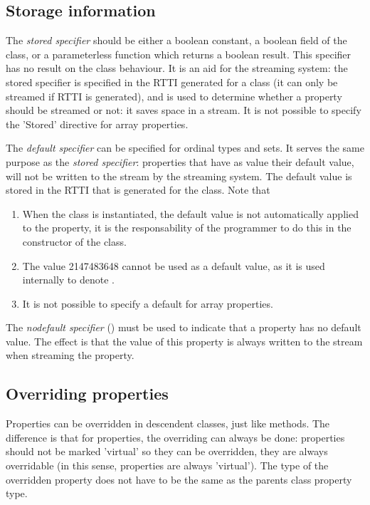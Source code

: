 \subsection{Storage information}
The {\em stored specifier} should be either a boolean constant, a boolean
field of the class, or a parameterless function which returns a boolean
result. This specifier has no result on the class behaviour. It is an aid
for the streaming system: the stored specifier is specified in the RTTI
generated for a class (it can only be streamed if RTTI is generated), 
and is used to determine whether a property should be streamed or not: 
it saves space in a stream. It is not possible to specify the 'Stored'
directive for array properties.

The {\em default specifier} can be specified for ordinal types and sets.
It serves the same purpose as the {\em stored specifier}: properties that
have as value their default value, will not be written to the stream by the
streaming system. The default value is stored in the RTTI that is generated
for the class. Note that
\begin{enumerate}
\item When the class is instantiated, the default value is not automatically
applied to the property, it is the responsability of the programmer to do
this in the constructor of the class.
\item The value 2147483648 cannot be used as a default value, as it is used
internally to denote .
\item It is not possible to specify a default for array properties.
\end{enumerate}

The {\em nodefault specifier} () must be used to indicate 
that a property has no default value. The effect is that the value of this
property is always written to the stream when streaming the property. 

\subsection{Overriding properties}
Properties can be overridden in descendent classes, just like methods. The
difference is that for properties, the overriding can always be done:
properties should not be marked 'virtual' so they can be overridden, they
are always overridable (in this sense, properties are always 'virtual').
The type of the overridden property does not have to be the same as the
parents class property type.

